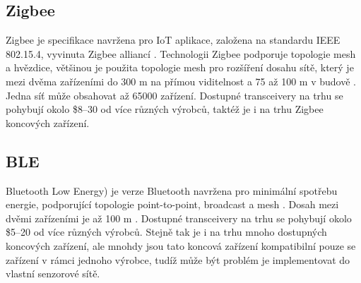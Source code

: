 
\subsection{Zigbee}
Zigbee je specifikace navržena pro IoT aplikace, založena na standardu  IEEE 802.15.4, vyvinuta Zigbee alliancí \cite{Zigbee_alliance_about}.
Technologii Zigbee podporuje topologie mesh a hvězdice, většinou je použita topologie mesh pro rozšíření dosahu sítě, který je mezi dvěma zařízeními do 300 m na přímou viditelnost a 75 až 100 m v budově \cite{Zigbee_alliance_solution}. Jedna síť může obsahovat až 65000 zařízení.
Dostupné transceivery na trhu se pohybují okolo \$8–30 od více různých výrobců, taktéž je i na trhu \DIFdelbegin {}\DIFdelend \DIFaddbegin {}\DIFaddend Zigbee koncových zařízení.


\subsection{BLE}
\DIFaddbegin {}\DIFaddend Bluetooth Low Energy\DIFdelbegin {}\DIFdelend ) je verze Bluetooth navržena pro minimální spotřebu energie, podporující topologie point-to-point, broadcast a mesh \cite{BT_alliance}.
Dosah mezi dvěmi zařízeními je až 100 m \cite{BT_nordic}.
Dostupné transceivery na trhu se pohybují okolo \$5–20 od více různých výrobců. Stejně tak je i na trhu mnoho dostupných koncových zařízení, ale mnohdy jsou tato koncová zařízení kompatibilní pouze se zařízení v rámci jednoho výrobce, tudíž může být problém je implementovat do vlastní senzorové sítě. 





